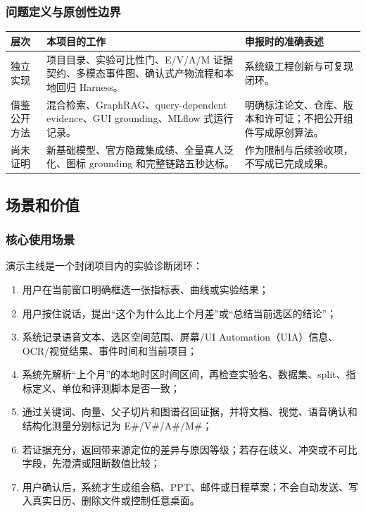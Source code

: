 \documentclass[UTF8,12pt]{ctexart}
\begin{document}
\subsubsection{问题定义与原创性边界}
\begin{center}
\small
\begin{tabularx}{\textwidth}{>{\raggedright\arraybackslash}p{}X X}
\toprule
层次 & 本项目的工作 & 申报时的准确表述\\
\midrule
独立实现 & 项目目录、实验可比性门、E/V/A/M 证据契约、多模态事件图、确认式产物流程和本地回归 Harness。 & 系统级工程创新与可复现闭环。\\
借鉴公开方法 & 混合检索、GraphRAG、query-dependent evidence、GUI grounding、MLflow 式运行记录。 & 明确标注论文、仓库、版本和许可证；不把公开组件写成原创算法。\\
尚未证明 & 新基础模型、官方隐藏集成绩、全量真人泛化、图标 grounding 和完整链路五秒达标。 & 作为限制与后续验收项，不写成已完成成果。\\
\bottomrule
\end{tabularx}
\end{center}

\subsection{场景和价值}

\subsubsection{核心使用场景}
演示主线是一个封闭项目内的实验诊断闭环：
\begin{enumerate}
  \item 用户在当前窗口明确框选一张指标表、曲线或实验结果；
  \item 用户按住说话，提出“这个为什么比上个月差”或“总结当前选区的结论”；
  \item 系统记录语音文本、选区空间范围、屏幕/UI Automation（UIA）信息、OCR/视觉结果、事件时间和当前项目；
  \item 系统先解析“上个月”的本地时区时间区间，再检查实验名、数据集、split、指标定义、单位和评测脚本是否一致；
  \item 通过关键词、向量、父子切片和图谱召回证据，并将文档、视觉、语音确认和结构化测量分别标记为 E\#/V\#/A\#/M\#；
  \item 若证据充分，返回带来源定位的差异与原因等级；若存在歧义、冲突或不可比字段，先澄清或阻断数值比较；
  \item 用户确认后，系统才生成组会稿、PPT、邮件或日程草案；不会自动发送、写入真实日历、删除文件或控制任意桌面。
\end{enumerate}
\end{document}
